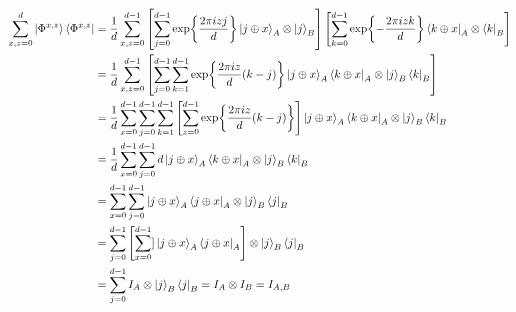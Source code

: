 \documentclass[a4paper, 11pt]{article}
\begin{document}
{\begin{align*}
	\sum_{x,z=0}^d\ket{\Phi^{x,z}} 	\bra{\Phi^{x,z}} & = \frac1d \sum_{x,z=0}^{d-1}\left[ \sum_{j=0}^{d-1}\exp{\frac{2\pi izj}{d}}\ket{j\oplus x}_A\otimes \ket{j}_B \right]\left[\sum_{k=0}^{d-1}\exp{-\frac{2\pi izk}{d}}\bra{k\oplus x}_A\otimes \bra{k}_B\right] \\
	                                                 & = \frac1d\sum_{x,z=0}^{d-1}\left[   \sum_{j=0}^{d-1}\sum_{k=1}^{d-1} \exp{\frac{2\pi iz}{d}(k-j)}\ket{j\oplus x}_A\bra{k\oplus x}_A\otimes\ket{j}_B\bra{k}_B   \right]                                       \\
	                                                 & = \frac1d\sum_{x=0}^{d-1}\sum_{j=0}^{d-1}\sum_{k=1}^{d-1} \left[  \sum_{z=0}^{d-1} \exp{\frac{2\pi iz}{d}(k-j)} \right]\ket{j\oplus x}_A\bra{k\oplus x}_A\otimes\ket{j}_B\bra{k}_B                               \\
	                                                 & = \frac1d\sum_{x=0}^{d-1}\sum_{j=0}^{d-1} d\ket{j\oplus x}_A\bra{k\oplus x}_A\otimes\ket{j}_B\bra{k}_B                                                                                                  \\
	                                                 & =  \sum_{x=0}^{d-1}\sum_{j=0}^{d-1} \ket{j\oplus x}_A\bra{j\oplus x}_A\otimes\ket{j}_B\bra{j}_B                                                                                                         \\
	                                                 & = \sum_{j=0}^{d-1} \left[ \sum_{x=0}^{d-1}]\ket{j\oplus x}_A\bra{j\oplus x}_A\right]\otimes\ket{j}_B\bra{j}_B                                                                                                \\
	                                                 & = \sum_{j=0}^{d-1} I_A\otimes\ket{j}_B\bra{j}_B= I_A\otimes I_B=I_{A,B}
\end{align*}
}

\end{document}
